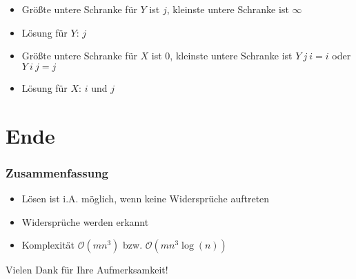 \documentclass[hyperref={pdfpagelabels=false}]{beamer}
\begin{document}
\begin{frame}
	\begin{itemize}
		\item Größte untere Schranke für $Y$ ist $j$, kleinste untere Schranke ist $\infty$
		\item Lösung für $Y$: $j$
		\item Größte untere Schranke für $X$ ist $0$, kleinste untere Schranke ist $Y\ j\ i = i$ oder $Y\ i\ j = j$
		\item Lösung für $X$: $i$ und $j$
	\end{itemize}
\end{frame}
\section{Ende}
\begin{frame}
	\frametitle{Zusammenfassung}
	\begin{itemize}
		\item Lösen ist i.A. möglich, wenn keine Widersprüche auftreten
		\item Widersprüche werden erkannt
		\item Komplexität $\mathcal{O}(m n^3)$ bzw. $\mathcal{O}(m n^3 \log(n))$
	\end{itemize}
\end{frame}
\begin{frame}
	\begin{center}
		Vielen Dank für Ihre Aufmerksamkeit!
	\end{center}
\end{frame}
\end{document}
